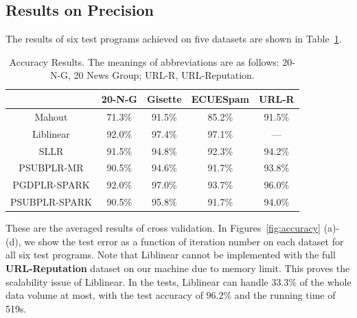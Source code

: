 \documentclass[10pt, conference, compsocconf]{IEEEtran}
\begin{document}
\subsection{Results on Precision} \label{sec:precision}
The results of six test programs achieved on five datasets are shown in Table~\ref{tab:table3}.
%
\begin{table}[h]
\centering
\caption{Accuracy Results. The meanings of abbreviations are as follows: 20-N-G, 20 News Group; URL-R, URL-Reputation.}\label{tab:table3}\vspace{-0.3cm}
\begin{tabular}{|c|c|c|c|c|}
\hline
           & 20-N-G & Gisette & ECUESpam & URL-R \\
\hline
Mahout     & 71.3\% & 91.5\% & 85.2\% & 91.5\% \\
\hline
Liblinear  & 92.0\% & 97.4\% & 97.1\% & --- \\
\hline
SLLR       & 91.5\% & 94.8\% & 92.3\% & 94.2\% \\
\hline
PSUBPLR-MR & 90.5\% & 94.6\% & 91.7\% & 93.8\% \\
\hline
PGDPLR-SPARK & 92.0\% & 97.0\% & 93.7\% & 96.0\% \\
\hline
PSUBPLR-SPARK & 90.5\% & 95.8\% & 91.7\% & 94.0\% \\
\hline
\end{tabular}
\end{table}
%
These are the averaged results of cross validation.
In Figures~\ref{fig:accuracy} (a)-(d), we show the test error as a function of iteration number on each dataset for all six test programs.
Note that Liblinear cannot be implemented with the full \textbf{URL-Reputation} dataset on our machine due to memory limit.
This proves the scalability issue of Liblinear.
In the tests, Liblinear can handle $33.3\%$ of the whole data volume at most, with the test accuracy of $96.2\%$ and the running time of 519s.
%
\end{document}
